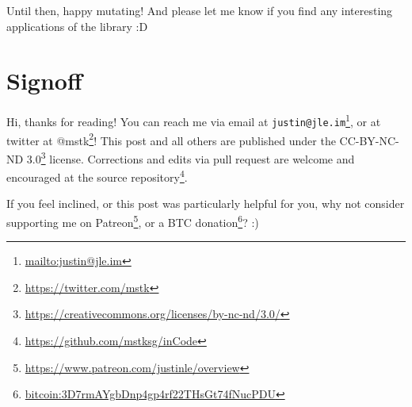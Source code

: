 \documentclass[]{article}
\renewcommand{\href}[2]{#2\footnote{\url{#1}}}
\begin{document}
Until then, happy mutating! And please let me know if you find any interesting
applications of the library :D

\hypertarget{signoff}{%
\section{Signoff}\label{signoff}}

Hi, thanks for reading! You can reach me via email at
\href{mailto:justin@jle.im}{\nolinkurl{justin@jle.im}}, or at twitter at
\href{https://twitter.com/mstk}{@mstk}! This post and all others are published
under the \href{https://creativecommons.org/licenses/by-nc-nd/3.0/}{CC-BY-NC-ND
3.0} license. Corrections and edits via pull request are welcome and encouraged
at \href{https://github.com/mstksg/inCode}{the source repository}.

If you feel inclined, or this post was particularly helpful for you, why not
consider \href{https://www.patreon.com/justinle/overview}{supporting me on
Patreon}, or a \href{bitcoin:3D7rmAYgbDnp4gp4rf22THsGt74fNucPDU}{BTC donation}?
:)
\end{document}
